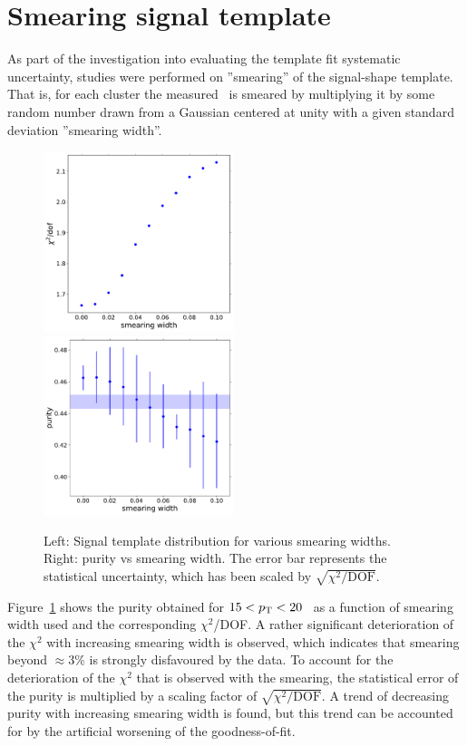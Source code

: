 \section{Smearing signal template}
\label{sec:smearingsignaltemplate}
As part of the investigation into evaluating the template fit systematic uncertainty, studies were performed on ''smearing'' of the signal-shape template. That is, for each cluster the measured \lambdasquare~is smeared by multiplying it by some random number drawn from a Gaussian centered at unity with a given standard deviation ''smearing width''.

\begin{figure}
	\center
	\includegraphics[width=0.495\textwidth]{Checks_Systematics/smeared-chi2s-pp-cluster_Lambda-15-20.pdf}
		\includegraphics[width=0.495\textwidth]{Checks_Systematics/smeared-purities-pp-cluster_Lambda-15-20.pdf}
		\caption{Left: Signal template distribution for various smearing widths. Right: purity vs smearing width. The error bar represents the statistical uncertainty, which has been scaled by $\sqrt{\chi^{2}/\mathrm{DOF}}$.}
	\label{fig:smearingSignalShape}
\end{figure}

Figure~\ref{fig:smearingSignalShape} shows the purity obtained for $15<p_{\mathrm{T}}<20$ \GeVc~as a function of smearing width used and the corresponding $\chi^{2}$/DOF. A rather significant deterioration of the $\chi^{2}$ with increasing smearing width is observed, which indicates that smearing beyond $\approx3\%$ is strongly disfavoured by the data. To account for the deterioration of the $\chi^{2}$ that is observed with the smearing, the statistical error of the purity is multiplied by a scaling factor of $\sqrt{\chi^{2}/\mathrm{DOF}}$. A trend of decreasing purity with increasing smearing width is found, but this trend can be accounted for by the artificial worsening of the goodness-of-fit. 


